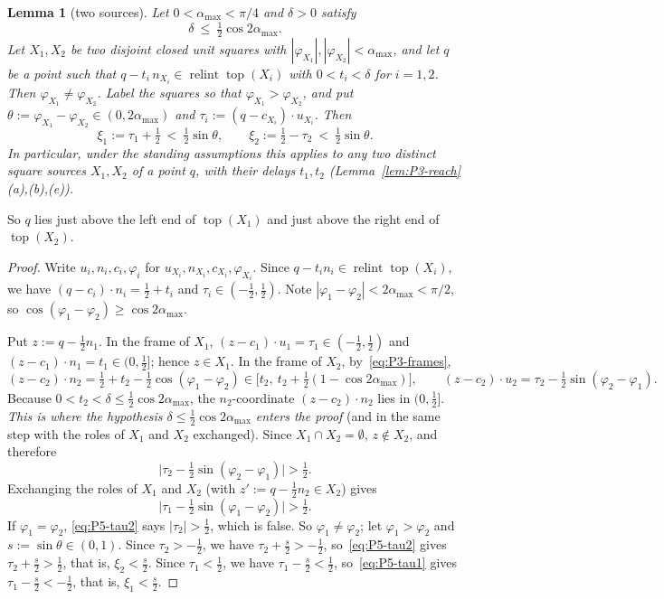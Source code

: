 \documentclass[11pt]{amsart}
\newcommand{\relint}{\operatorname{relint}}
\newcommand{\Top}{\operatorname{top}}
\newcommand{\amax}{\alpha_{\max}}
\newtheorem{lemma}[theorem]{Lemma}
\theoremstyle{definition}
\theoremstyle{remark}
\numberwithin{equation}{section}
\begin{document}
\begin{lemma}[two sources]\label{lem:P5-two}
Let $0<\amax<\pi/4$ and $\delta>0$ satisfy
\[
\delta\ \le\ \tfrac12\cos2\amax .
\]
Let $X_1,X_2$ be two disjoint closed unit squares with $|\varphi_{X_1}|,|\varphi_{X_2}|<\amax$, and let $q$ be a point such that $q-t_i\,n_{X_i}\in\relint\Top(X_i)$ with $0<t_i<\delta$ for $i=1,2$. Then $\varphi_{X_1}\ne\varphi_{X_2}$. Label the squares so that $\varphi_{X_1}>\varphi_{X_2}$, and put $\theta:=\varphi_{X_1}-\varphi_{X_2}\in(0,2\amax)$ and $\tau_i:=(q-c_{X_i})\cdot u_{X_i}$. Then
\[
\xi_1:=\tau_1+\tfrac12\ <\ \tfrac12\sin\theta,\qquad \xi_2:=\tfrac12-\tau_2\ <\ \tfrac12\sin\theta .
\]
In particular, under the standing assumptions this applies to any two distinct square sources $X_1,X_2$ of a point $q$, with their delays $t_1,t_2$ (Lemma~\ref{lem:P3-reach}(a),(b),(e)).
\end{lemma}

So $q$ lies just above the left end of $\Top(X_1)$ and just above the right end of $\Top(X_2)$.

\begin{proof}
Write $u_i,n_i,c_i,\varphi_i$ for $u_{X_i},n_{X_i},c_{X_i},\varphi_{X_i}$. Since $q-t_in_i\in\relint\Top(X_i)$, we have $(q-c_i)\cdot n_i=\frac12+t_i$ and $\tau_i\in(-\frac12,\frac12)$. Note $|\varphi_1-\varphi_2|<2\amax<\pi/2$, so $\cos(\varphi_1-\varphi_2)\ge\cos2\amax$.

Put $z:=q-\frac12n_1$. In the frame of $X_1$, $(z-c_1)\cdot u_1=\tau_1\in(-\frac12,\frac12)$ and $(z-c_1)\cdot n_1=t_1\in(0,\frac12]$; hence $z\in X_1$. In the frame of $X_2$, by~\eqref{eq:P3-frames},
\[
(z-c_2)\cdot n_2=\tfrac12+t_2-\tfrac12\cos(\varphi_1-\varphi_2)\in\big[t_2,\ t_2+\tfrac12(1-\cos2\amax)\big],
\qquad
(z-c_2)\cdot u_2=\tau_2-\tfrac12\sin(\varphi_2-\varphi_1).
\]
Because $0<t_2<\delta\le\frac12\cos2\amax$, the $n_2$-coordinate $(z-c_2)\cdot n_2$ lies in $(0,\frac12]$. \emph{This is where the hypothesis $\delta\le\frac12\cos2\amax$ enters the proof} (and in the same step with the roles of $X_1$ and $X_2$ exchanged). Since $X_1\cap X_2=\emptyset$, $z\notin X_2$, and therefore
\begin{equation}\label{eq:P5-tau2}
\big|\tau_2-\tfrac12\sin(\varphi_2-\varphi_1)\big|>\tfrac12 .
\end{equation}
Exchanging the roles of $X_1$ and $X_2$ (with $z':=q-\frac12n_2\in X_2$) gives
\begin{equation}\label{eq:P5-tau1}
\big|\tau_1-\tfrac12\sin(\varphi_1-\varphi_2)\big|>\tfrac12 .
\end{equation}
If $\varphi_1=\varphi_2$, \eqref{eq:P5-tau2} says $|\tau_2|>\frac12$, which is false. So $\varphi_1\ne\varphi_2$; let $\varphi_1>\varphi_2$ and $s:=\sin\theta\in(0,1)$. Since $\tau_2>-\frac12$, we have $\tau_2+\frac s2>-\frac12$, so~\eqref{eq:P5-tau2} gives $\tau_2+\frac s2>\frac12$, that is, $\xi_2<\frac s2$. Since $\tau_1<\frac12$, we have $\tau_1-\frac s2<\frac12$, so~\eqref{eq:P5-tau1} gives $\tau_1-\frac s2<-\frac12$, that is, $\xi_1<\frac s2$.
\end{proof}
\end{document}
